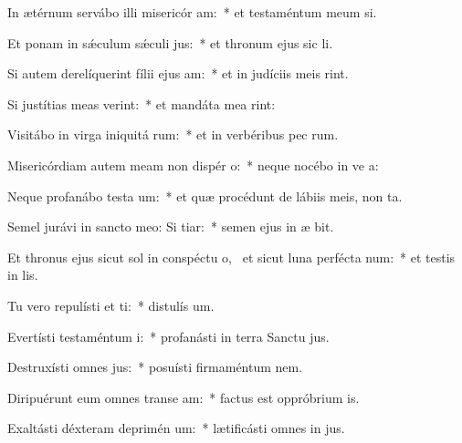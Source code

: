 \item In ætérnum servábo illi misericór am:~* et testaméntum meum  si.
\item Et ponam in sǽculum sǽculi  jus:~* et thronum ejus sic  li.
\item Si autem derelíquerint fílii ejus  am:~* et in judíciis meis  rint.
\item Si justítias meas verint:~* et mandáta mea  rint:
\item Visitábo in virga iniquitá rum:~* et in verbéribus pec rum.
\item Misericórdiam autem meam non dispér  o:~* neque nocébo in ve a:
\item Neque profanábo testa um:~* et quæ procédunt de lábiis meis, non  ta.
\item Semel jurávi in sancto meo: Si  tiar:~* semen ejus in æ bit.
\item Et thronus ejus sicut sol in conspéctu o,~\pscross{} et sicut luna perfécta  num:~* et testis in  lis.
\item Tu vero repulísti et ti:~* distulís  um.
\item Evertísti testaméntum  i:~* profanásti in terra Sanctu jus.
\item Destruxísti omnes  jus:~* posuísti firmaméntum  nem.
\item Diripuérunt eum omnes transe am:~* factus est oppróbrium  is.
\item Exaltásti déxteram deprimén um:~* lætificásti omnes in jus.
